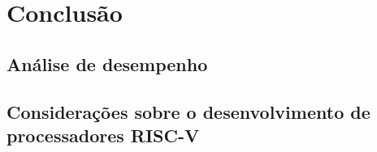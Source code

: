 
\chapter{Conclusão}
\label{cap:4}

\section{Análise de desempenho}
\label{sec:desem}

\section{Considerações sobre o desenvolvimento de processadores RISC-V}
\label{sec:fim}


